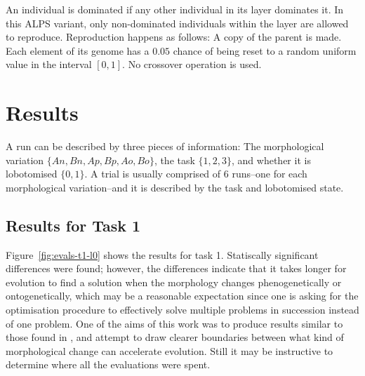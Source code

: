 An individual is dominated if any other individual in its layer
dominates it.  In this ALPS variant, only non-dominated individuals
within the layer are allowed to reproduce.  Reproduction happens as
follows: A copy of the parent is made.  Each element of its genome has
a $0.05$ chance of being reset to a random uniform value in the
interval $[0, 1]$.  No crossover operation is used.

\chapter{Results}

A run can be described by three pieces of information: The
morphological variation $\{An, Bn, Ap, Bp, Ao, Bo\}$, the task
$\{1,2,3\}$, and whether it is lobotomised $\{0, 1\}$.  A trial is
usually comprised of 6 runs--one for each morphological variation--and
it is described by the task and lobotomised state.

\section{Results for Task 1}

Figure~\ref{fig:evals-t1-l0} shows the results for task 1.
Statiscally significant differences were found; however, the
differences indicate that it takes longer for evolution to find a
solution when the morphology changes phenogenetically or
ontogenetically, which may be a reasonable expectation since one is
asking for the optimisation procedure to effectively solve multiple
problems in succession instead of one problem.  One of the aims of
this work was to produce results similar to those found in
\cite{Bongard:2011p3716}, and attempt to draw clearer boundaries
between what kind of morphological change can accelerate evolution.
Still it may be instructive to determine where all the evaluations
were spent.


